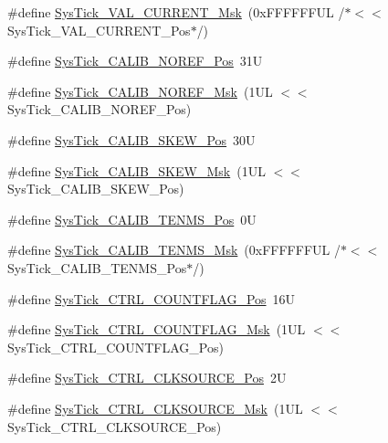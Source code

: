 \begin{DoxyCompactItemize}
\item 
\#define \hyperlink{group___c_m_s_i_s___sys_tick_gafc77b56d568930b49a2474debc75ab45}{Sys\+Tick\+\_\+\+V\+A\+L\+\_\+\+C\+U\+R\+R\+E\+N\+T\+\_\+\+Msk}~(0x\+F\+F\+F\+F\+F\+F\+U\+L /$\ast$$<$$<$ Sys\+Tick\+\_\+\+V\+A\+L\+\_\+\+C\+U\+R\+R\+E\+N\+T\+\_\+\+Pos$\ast$/)
\item 
\#define \hyperlink{group___c_m_s_i_s___sys_tick_ga534dbe414e7a46a6ce4c1eca1fbff409}{Sys\+Tick\+\_\+\+C\+A\+L\+I\+B\+\_\+\+N\+O\+R\+E\+F\+\_\+\+Pos}~31U
\item 
\#define \hyperlink{group___c_m_s_i_s___sys_tick_ga3af0d891fdd99bcc8d8912d37830edb6}{Sys\+Tick\+\_\+\+C\+A\+L\+I\+B\+\_\+\+N\+O\+R\+E\+F\+\_\+\+Msk}~(1\+U\+L $<$$<$ Sys\+Tick\+\_\+\+C\+A\+L\+I\+B\+\_\+\+N\+O\+R\+E\+F\+\_\+\+Pos)
\item 
\#define \hyperlink{group___c_m_s_i_s___sys_tick_gadd0c9cd6641b9f6a0c618e7982954860}{Sys\+Tick\+\_\+\+C\+A\+L\+I\+B\+\_\+\+S\+K\+E\+W\+\_\+\+Pos}~30U
\item 
\#define \hyperlink{group___c_m_s_i_s___sys_tick_ga8a6a85a87334776f33d77fd147587431}{Sys\+Tick\+\_\+\+C\+A\+L\+I\+B\+\_\+\+S\+K\+E\+W\+\_\+\+Msk}~(1\+U\+L $<$$<$ Sys\+Tick\+\_\+\+C\+A\+L\+I\+B\+\_\+\+S\+K\+E\+W\+\_\+\+Pos)
\item 
\#define \hyperlink{group___c_m_s_i_s___sys_tick_gacae558f6e75a0bed5d826f606d8e695e}{Sys\+Tick\+\_\+\+C\+A\+L\+I\+B\+\_\+\+T\+E\+N\+M\+S\+\_\+\+Pos}~0U
\item 
\#define \hyperlink{group___c_m_s_i_s___sys_tick_gaf1e68865c5aece2ad58971225bd3e95e}{Sys\+Tick\+\_\+\+C\+A\+L\+I\+B\+\_\+\+T\+E\+N\+M\+S\+\_\+\+Msk}~(0x\+F\+F\+F\+F\+F\+F\+U\+L /$\ast$$<$$<$ Sys\+Tick\+\_\+\+C\+A\+L\+I\+B\+\_\+\+T\+E\+N\+M\+S\+\_\+\+Pos$\ast$/)
\item 
\#define \hyperlink{group___c_m_s_i_s___sys_tick_gadbb65d4a815759649db41df216ed4d60}{Sys\+Tick\+\_\+\+C\+T\+R\+L\+\_\+\+C\+O\+U\+N\+T\+F\+L\+A\+G\+\_\+\+Pos}~16U
\item 
\#define \hyperlink{group___c_m_s_i_s___sys_tick_ga1bf3033ecccf200f59baefe15dbb367c}{Sys\+Tick\+\_\+\+C\+T\+R\+L\+\_\+\+C\+O\+U\+N\+T\+F\+L\+A\+G\+\_\+\+Msk}~(1\+U\+L $<$$<$ Sys\+Tick\+\_\+\+C\+T\+R\+L\+\_\+\+C\+O\+U\+N\+T\+F\+L\+A\+G\+\_\+\+Pos)
\item 
\#define \hyperlink{group___c_m_s_i_s___sys_tick_ga24fbc69a5f0b78d67fda2300257baff1}{Sys\+Tick\+\_\+\+C\+T\+R\+L\+\_\+\+C\+L\+K\+S\+O\+U\+R\+C\+E\+\_\+\+Pos}~2U
\item 
\#define \hyperlink{group___c_m_s_i_s___sys_tick_gaa41d06039797423a46596bd313d57373}{Sys\+Tick\+\_\+\+C\+T\+R\+L\+\_\+\+C\+L\+K\+S\+O\+U\+R\+C\+E\+\_\+\+Msk}~(1\+U\+L $<$$<$ Sys\+Tick\+\_\+\+C\+T\+R\+L\+\_\+\+C\+L\+K\+S\+O\+U\+R\+C\+E\+\_\+\+Pos)

\end{DoxyCompactItemize}

